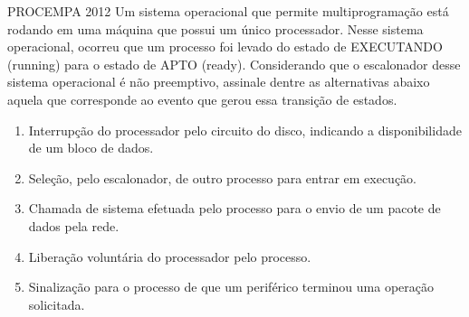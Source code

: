 \documentclass[aspectratio=169,
				xcolor=table]{beamer}
\begin{document}
	\begin{frame}{PROCEMPA 2012}
		Um sistema operacional que permite multiprogramação está rodando em uma máquina que possui um único processador. Nesse sistema operacional, ocorreu que um processo foi levado do estado de EXECUTANDO (running) para o estado de APTO (ready). Considerando que o escalonador desse sistema operacional é não preemptivo, assinale dentre as alternativas abaixo aquela que corresponde ao evento que gerou essa transição de estados.
		\begin{enumerate}[a]
			\item Interrupção do processador pelo circuito do disco, indicando a disponibilidade de um bloco de dados.
			\item Seleção, pelo escalonador, de outro processo para entrar em execução.
			\item Chamada de sistema efetuada pelo processo para o envio de um pacote de dados pela rede.
			\item \alert{Liberação voluntária do processador pelo processo.}
			\item Sinalização para o processo de que um periférico terminou uma operação solicitada.
			
		\end{enumerate}
	\end{frame}	
	
	
	
	\begin{frame}{}
	\end{frame}	
\end{document}
